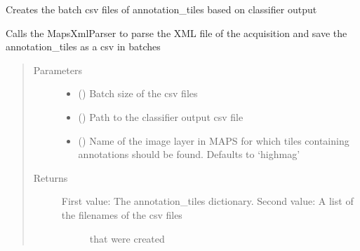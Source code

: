 \documentclass[letterpaper,10pt,english]{sphinxmanual}
\begin{document}
\begin{fulllineitems}
\begin{fulllineitems}
\begin{quote}
\begin{description}
\end{description}\end{quote}

\end{fulllineitems}


\begin{fulllineitems}
\label{\detokenize{index:stitch_MAPS_annotations.Stitcher.parse_create_classifier_csv_batches}}
Creates the batch csv files of annotation\_tiles based on classifier output

Calls the MapsXmlParser to parse the XML file of the acquisition and save the annotation\_tiles as a csv in
batches
\begin{quote}\begin{description}
\item[{Parameters}] \leavevmode\begin{itemize}
\item {} 
 () \textendash{} Batch size of the csv files

\item {} 
 () \textendash{} Path to the classifier output csv file

\item {} 
 () \textendash{} Name of the image layer in MAPS for which tiles containing annotations should
be found. Defaults to ‘highmag’

\end{itemize}

\item[{Returns}] \leavevmode
\begin{description}
\item[{First value: The annotation\_tiles dictionary. Second value: A list of the filenames of the csv files}] \leavevmode
that were created


\end{description}
\end{description}
\end{quote}
\end{fulllineitems}
\end{fulllineitems}
\end{document}
